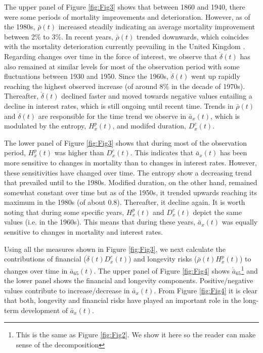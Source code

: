 \documentclass[12pt]{article}
\begin{document}
The upper panel of Figure \ref{fig:Fig3} shows that between 1860 and 1940, there were some periods of mortality improvements and deterioration. However, as of the 1980s, $\bar{\rho}(t)$ increased steadily indicating an average mortality improvement between 2\% to 3\%. In recent years, $\bar{\rho}(t)$ trended downwards, which coincides with the mortality deterioration currently prevailing in the United Kingdom \citep{djeundje2022slowdown}. Regarding changes over time in the force of interest, we observe that $\dot{\delta}(t)$ has also remained at similar levels for most of the observation period with some fluctuations between 1930 and 1950. Since the 1960s, $\dot{\delta}(t)$ went up rapidly reaching the highest observed increase (of around 8\% in the decade of 1970s). Thereafter, $\dot{\delta}(t)$ declined faster and moved towards negative values entailing a decline in interest rates, which is still ongoing until recent time. Trends in $\bar{\rho}(t)$ and $\dot{\delta}(t)$ are responsible for the time trend we observe in $\bar{a}_x(t)$, which is modulated by the entropy, ${H}^{p}_x(t)$, and modifed duration, ${D}^{c}_x(t)$.


The lower panel of Figure \ref{fig:Fig3} shows that during most of the observation period, ${H}^{p}_x(t)$ was higher than ${D}^{c}_x(t)$. This indicates that $\bar{a}_x(t)$ has been more sensitive to changes in mortality than to changes in interest rates. However, these sensitivities have changed over time. The entropy show a decreasing trend that prevailed until to the 1980s. Modified duration, on the other hand, remained somewhat constant over time but as of the 1950s, it trended upwards reaching its maximum in the 1980s (of about 0.8). Thereafter, it decline again. It is worth noting that during some specific years, ${H}^{p}_x(t)$ and ${D}^{c}_x(t)$ depict the same values (i.e. in the 1960s). This means that during these years, $\bar{a}_x(t)$ was equally sensitive to changes in mortality and interest rates.




Using all the measures shown in Figure \ref{fig:Fig3}, we next calculate the contributions of financial ($\dot{\delta}(t){D}^{c}_x(t)$) and longevity risks ($\bar{\rho}(t){H}^{p}_x(t)$) to changes over time in $\bar{a}_{65}(t)$. The upper panel of Figure \ref{fig:Fig4} shows $\acute{\bar{a}}_{65}$\footnote{This is the same as Figure \ref{fig:Fig2}. We show it here so the reader can make sense of the decomposition} and the lower panel shows the financial and longevity components. Positive/negative values contribute to increase/decrease in $\bar{a}_x(t)$. From Figure \ref{fig:Fig4} it is clear that both, longevity and financial risks have played an important role in the long-term development of $\bar{a}_x(t)$. 
\end{document}
